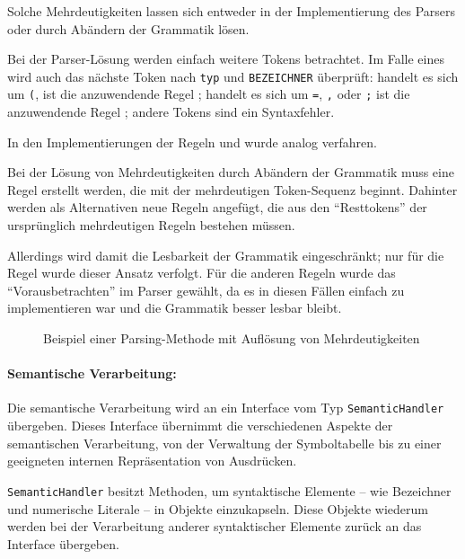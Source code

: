 \documentclass[twoside,a4paper,fleqn,12pt]{article}
\begin{document}
Solche Mehrdeutigkeiten lassen sich entweder in der Implementierung des Parsers oder durch Abändern der Grammatik lösen.

Bei der Parser-Lösung werden einfach weitere Tokens betrachtet. Im Falle eines  
wird auch das nächste Token nach \glq\texttt{typ}\grq{} und \glq\texttt{BEZEICHNER}\grq{} überprüft:
handelt es sich um \glq\texttt{(}\grq, ist die anzuwendende Regel ;
handelt es sich um \glq\texttt{=}\grq, \glq\texttt{,}\grq{} oder \glq\texttt{;}\grq{} ist die anzuwendende Regel ;
andere Tokens sind ein Syntaxfehler.

In den Implementierungen der Regeln  und  wurde analog verfahren.

Bei der Lösung von Mehrdeutigkeiten durch Abändern der Grammatik muss eine Regel erstellt werden,
die mit der mehrdeutigen Token-Sequenz beginnt. Dahinter werden als Alternativen neue Regeln angefügt,
die aus den "`Resttokens"' der ursprünglich mehrdeutigen Regeln bestehen müssen. %

Allerdings wird damit die Lesbarkeit der Grammatik eingeschränkt; nur für die Regel  wurde dieser Ansatz verfolgt.
Für die anderen Regeln wurde das "`Vorausbetrachten"' im Parser gewählt, da es in diesen Fällen einfach zu implementieren war
und die Grammatik besser lesbar bleibt.

\begin{figure}[h]
   \centering
  
  \caption{Beispiel einer Parsing-Methode mit Auflösung von Mehrdeutigkeiten}
  \label{fig:ParseProgramStatements}
\end{figure}

\paragraph{Semantische Verarbeitung:}
Die semantische Verarbeitung wird an ein Interface vom Typ \verb+SemanticHandler+ übergeben.
Dieses Interface übernimmt die verschiedenen Aspekte der semantischen Verarbeitung, von der Verwaltung der
Symboltabelle bis zu einer geeigneten internen Repräsentation von Ausdrücken.

\verb+SemanticHandler+ besitzt Methoden, um syntaktische Elemente -- wie Bezeichner und numerische Literale -- in Objekte 
einzukapseln. Diese Objekte wiederum werden bei der Verarbeitung anderer syntaktischer Elemente
zurück an das Interface übergeben. %
\end{document}
